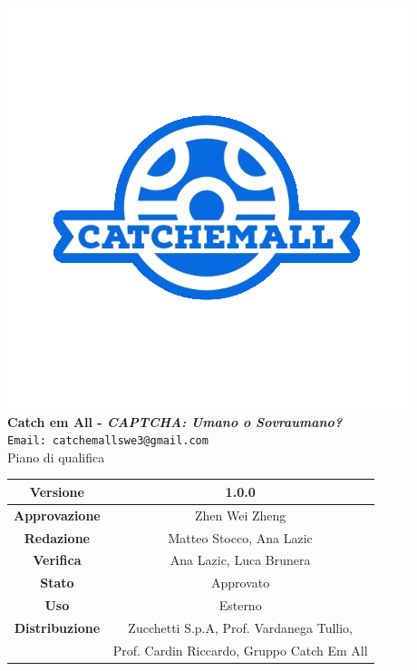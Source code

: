 \begin{titlepage}
\begin{center}
	\includegraphics[scale = 1.5]{img/logo.png}\\
	\bigskip
	\large \textbf{Catch em All - \textit{CAPTCHA: Umano o Sovraumano?}}\\
	\texttt{Email: catchemallswe3@gmail.com}\\
	\vfill
	{\fontsize{1.5cm}{0}\selectfont Piano di qualifica}\\
	\vfill
	\setlength\extrarowheight{5pt}
	\begin{tabularx}{\textwidth}{| c | c |}
		\hline
		\textbf{Versione} & 1.0.0\\
		\hline
		\textbf{Approvazione} & Zhen Wei Zheng\\
		\hline
		\textbf{Redazione} & Matteo Stocco, Ana Lazic\\
		\hline
		\textbf{Verifica} & Ana Lazic, Luca Brunera\\
		\hline
		\textbf{Stato} & Approvato\\
		\hline
		\textbf{Uso} & Esterno\\
		\hline
		\textbf{Distribuzione} & Zucchetti S.p.A, Prof. Vardanega Tullio,\\
		& Prof. Cardin Riccardo, Gruppo Catch Em All\\
		\hline
	\end{tabularx}
\end{center}
\end{titlepage}
